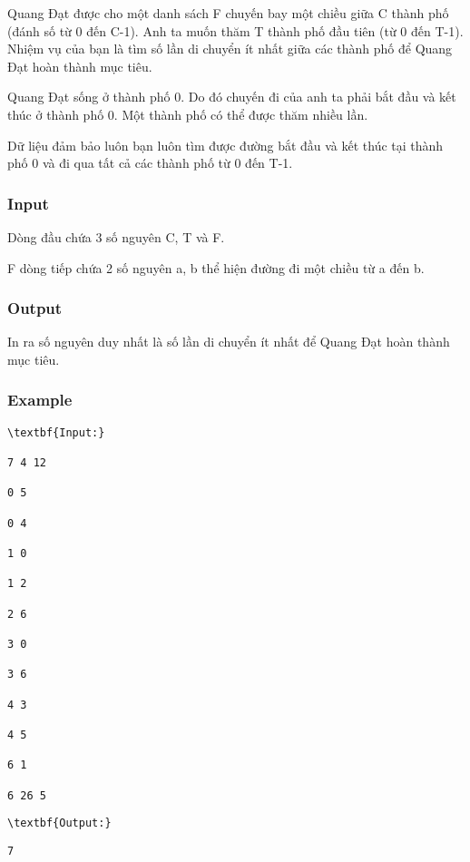 



   Quang Đạt được cho một danh sách F chuyến bay một chiều giữa C thành phố (đánh số từ 0 đến C-1). Anh ta muốn thăm T thành phố đầu tiên (từ 0 đến T-1). Nhiệm vụ của bạn là tìm số lần di chuyển ít nhất giữa các thành phố để Quang Đạt hoàn thành mục tiêu.  

   Quang Đạt sống ở thành phố 0. Do đó chuyến đi của anh ta phải bắt đầu và kết thúc ở thành phố 0. Một thành phố có thể được thăm nhiều lần.  

   Dữ liệu đảm bảo luôn bạn luôn tìm được đường bắt đầu và kết thúc tại thành phố 0 và đi qua tất cả các thành phố từ 0 đến T-1.  

\subsubsection{   Input  }

   Dòng đầu chứa 3 số nguyên C, T và F.  

   F dòng tiếp chứa 2 số nguyên a, b thể hiện đường đi một chiều từ a đến b.  

\subsubsection{   Output  }

   In ra số nguyên duy nhất là số lần di chuyển ít nhất để Quang Đạt hoàn thành mục tiêu.  

\subsubsection{   Example  }
\begin{verbatim}
\textbf{Input:}

7 4 12

0 5

0 4

1 0

1 2

2 6

3 0

3 6

4 3

4 5

6 1

6 26 5\end{verbatim}
\begin{verbatim}
\textbf{Output:}\end{verbatim}
\begin{verbatim}
7\end{verbatim}

